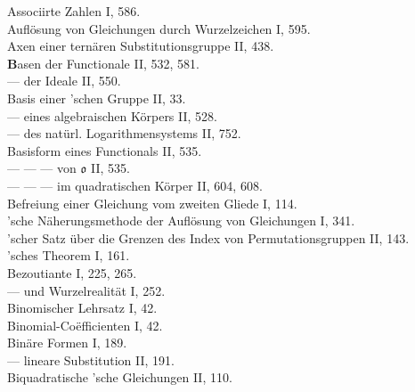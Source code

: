 Associirte Zahlen I, 586.\\
Aufl\"osung von Gleichungen durch Wurzelzeichen I, 595.\\
Axen einer tern\"aren Substitutionsgruppe II, 438.\\

\medskip
\noindent
\textbf{B}asen der Functionale II, 532, 581.\\
--- der Ideale II, 550.\\
Basis einer 'schen Gruppe II, 33.\\
--- eines algebraischen K\"orpers II, 528.\\
--- des nat\"url. Logarithmensystems II, 752.\\
Basisform eines Functionals II, 535.\\
--- --- --- von $\mathfrak{o}$ II, 535.\\
--- --- --- im quadratischen K\"orper II, 604, 608.\\
Befreiung einer Gleichung vom zweiten Gliede I, 114.\\
'sche N\"aherungsmethode der Aufl\"osung von Gleichungen I, 341.\\
'scher Satz \"uber die Grenzen des Index von Permutationsgruppen II, 143.\\
'sches Theorem I, 161.\\
Bezoutiante I, 225, 265.\\
--- und Wurzelrealit\"at I, 252.\\
Binomischer Lehrsatz I, 42.\\
Binomial-Co\"efficienten I, 42.\\
Bin\"are Formen I, 189.\\
--- lineare Substitution II, 191.\\
Biquadratische 'sche Gleichungen II, 110.\\

\bigskip
\noindent
